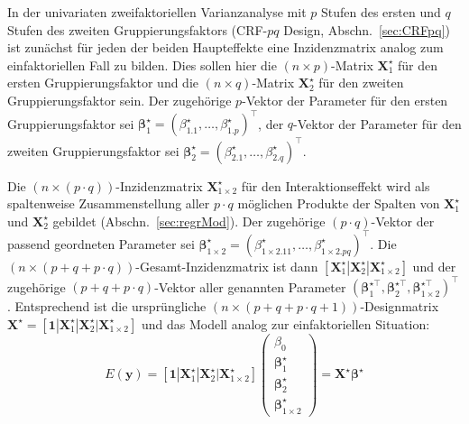 In der univariaten zweifaktoriellen Varianzanalyse mit $p$ Stufen des ersten und $q$ Stufen des zweiten Gruppierungsfaktors (CRF-$pq$ Design, Abschn.\ \ref{sec:CRFpq}) ist zunächst für jeden der beiden Haupteffekte eine Inzidenzmatrix analog zum einfaktoriellen Fall zu bilden. Dies sollen hier die $(n \times p)$-Matrix $\bm{X}_{1}^{\star}$ für den ersten Gruppierungsfaktor und die $(n \times q)$-Matrix $\bm{X}_{2}^{\star}$ für den zweiten Gruppierungsfaktor sein. Der zugehörige $p$-Vektor der Parameter für den ersten Gruppierungsfaktor sei $\bm{\beta}_{1}^{\star} = (\beta_{1.1}^{\star}, \ldots, \beta_{1.p}^{\star})^{\top}$, der $q$-Vektor der Parameter für den zweiten Gruppierungsfaktor sei $\bm{\beta}_{2}^{\star} = (\beta_{2.1}^{\star}, \ldots, \beta_{2.q}^{\star})^{\top}$.

Die $(n \times (p \cdot q))$-Inzidenzmatrix $\bm{X}_{1 \times 2}^{\star}$ für den Interaktionseffekt wird als spaltenweise Zusammenstellung aller $p \cdot q$ möglichen Produkte der Spalten von $\bm{X}_{1}^{\star}$ und $\bm{X}_{2}^{\star}$ gebildet (Abschn.\ \ref{sec:regrMod}). Der zugehörige $(p \cdot q)$-Vektor der passend geordneten Parameter sei $\bm{\beta}_{1 \times 2}^{\star} = (\beta_{1 \times 2.11}^{\star}, \ldots, \beta_{1 \times 2.pq}^{\star})^{\top}$. Die $(n \times (p + q + p \cdot q))$-Gesamt-Inzidenzmatrix ist dann $[\bm{X}_{1}^{\star} | \bm{X}_{2}^{\star} | \bm{X}_{1 \times 2}^{\star}]$ und der zugehörige $(p + q + p \cdot q)$-Vektor aller genannten Parameter $(\bm{\beta}_{1}^{\star \top}, \bm{\beta}_{2}^{\star  \top}, \bm{\beta}_{1 \times 2}^{\star  \top})^{\top}$. Entsprechend ist die ursprüngliche $(n \times (p + q + p \cdot q + 1))$-Designmatrix $\bm{X}^{\star} = [\bm{1} | \bm{X}_{1}^{\star} | \bm{X}_{2}^{\star} | \bm{X}_{1 \times 2}^{\star}]$ und das Modell analog zur einfaktoriellen Situation:
\begin{equation*}
E(\bm{y}) = [\bm{1} | \bm{X}_{1}^{\star} | \bm{X}_{2}^{\star} | \bm{X}_{1 \times 2}^{\star}] \left(\begin{array}{l} \beta_{0} \\ \bm{\beta}_{1}^{\star} \\ \bm{\beta}_{2}^{\star} \\ \bm{\beta}_{1 \times 2}^{\star} \end{array}\right) = \bm{X}^{\star} \bm{\beta}^{\star}
\end{equation*}

